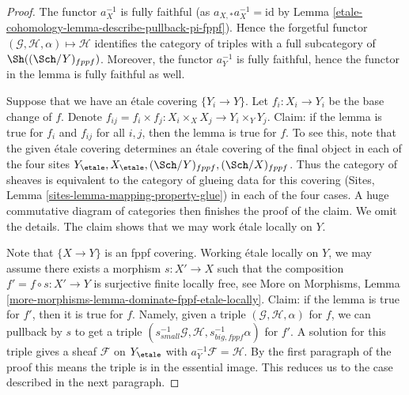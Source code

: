 \begin{proof}
The functor $a_X^{-1}$ is fully faithful (as $a_{X, *}a_X^{-1} = \text{id}$ by
Lemma \ref{etale-cohomology-lemma-describe-pullback-pi-fppf}). Hence the forgetful functor
$(\mathcal{G}, \mathcal{H}, \alpha) \mapsto \mathcal{H}$ identifies the
category of triples with a full subcategory of $\Sh((\Sch/Y)_{fppf})$.
Moreover, the functor $a_Y^{-1}$ is fully faithful, hence the functor
in the lemma is fully faithful as well.

\medskip\noindent
Suppose that we have an \'etale covering $\{Y_i \to Y\}$.
Let $f_i : X_i \to Y_i$ be the base change of $f$.
Denote $f_{ij} = f_i \times f_j : X_i \times_X X_j  \to Y_i \times_Y Y_j$.
Claim: if the lemma is true for $f_i$ and $f_{ij}$ for all $i, j$, then
the lemma is true for $f$. To see this, note that the given \'etale covering
determines an \'etale covering of the final object in each of
the four sites $Y_\etale, X_\etale, (\Sch/Y)_{fppf}, (\Sch/X)_{fppf}$.
Thus the category of sheaves is equivalent to the category of
glueing data for this covering
(Sites, Lemma \ref{sites-lemma-mapping-property-glue})
in each of the four cases. A huge commutative diagram of
categories then finishes the proof of the claim. We omit the details.
The claim shows that we may work \'etale locally on $Y$.

\medskip\noindent
Note that $\{X \to Y\}$ is an fppf covering. Working \'etale locally on $Y$,
we may assume there exists a morphism $s : X' \to X$ such that the composition
$f' = f \circ s : X' \to Y$ is surjective finite locally free, see
More on Morphisms, Lemma
\ref{more-morphisms-lemma-dominate-fppf-etale-locally}.
Claim: if the lemma is true for $f'$, then it is true for $f$.
Namely, given a triple $(\mathcal{G}, \mathcal{H}, \alpha)$
for $f$, we can pullback by $s$ to get a triple
$(s_{small}^{-1}\mathcal{G}, \mathcal{H}, s_{big, fppf}^{-1}\alpha)$
for $f'$. A solution for this triple gives a sheaf
$\mathcal{F}$ on $Y_\etale$ with $a_Y^{-1}\mathcal{F} = \mathcal{H}$.
By the first paragraph of the proof this means the triple is
in the essential image. This reduces us to
the case described in the next paragraph.


\end{proof}
